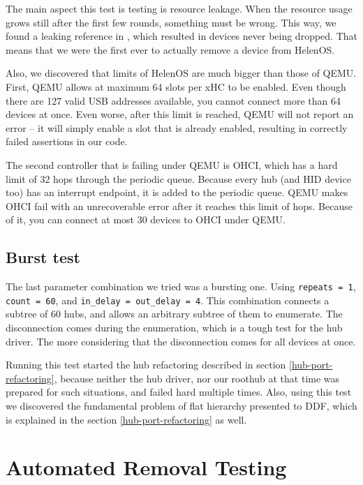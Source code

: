 The main aspect this test is testing is resource leakage. When the resource
usage grows still after the first few rounds, something must be wrong. This
way, we found a leaking reference in , which resulted in devices
never being dropped. That means that we were the first ever to actually remove
a device from HelenOS.

Also, we discovered that limits of HelenOS are much bigger than those of QEMU.
First, QEMU allows at maximum 64 slots per xHC to be enabled. Even though there
are 127 valid USB addresses available, you cannot connect more than 64 devices
at once. Even worse, after this limit is reached, QEMU will not report an error
-- it will simply enable a slot that is already enabled, resulting in correctly
failed assertions in our code.

The second controller that is failing under QEMU is OHCI, which has a hard
limit of 32 hops through the periodic queue. Because every hub (and HID device
too) has an interrupt endpoint, it is added to the periodic queue. QEMU makes
OHCI fail with an unrecoverable error after it reaches this limit of hops.
Because of it, you can connect at most 30 devices to OHCI under QEMU.

\subsection{Burst test}

The last parameter combination we tried was a bursting one. Using
\texttt{repeats = 1}, \texttt{count = 60}, and \texttt{in\_delay = out\_delay
= 4}. This combination connects a subtree of 60 hubs, and allows an arbitrary
subtree of them to enumerate. The disconnection comes during the enumeration,
which is a tough test for the hub driver. The more considering that the
disconnection comes for all devices at once.

Running this test started the hub refactoring described in section
\ref{hub-port-refactoring}, because neither the hub driver, nor our roothub at
that time was prepared for such situations, and failed hard multiple times.
Also, using this test we discovered the fundamental problem of flat hierarchy
presented to DDF, which is explained in the section \ref{hub-port-refactoring}
as well.

\section{Automated Removal Testing}

